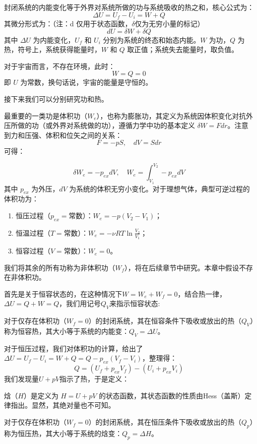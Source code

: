 \begin{proposition}[热力学第一定律]
封闭系统的内能变化等于外界对系统所做的功与系统吸收的热之和，核心公式为：$$\Delta U = U_f - U_i = W + Q$$ 
其微分形式为：（注：d 仅用于状态函数，$\delta$仅为无穷小量的标记）
$$dU = \delta W +\delta Q $$
其中 $\Delta U$ 为内能变化，$U_f$ 和 $U_i$ 分别为系统的终态和始态内能。$W$ 为功，$Q$ 为热，符号上，系统获得能量时，$W$ 和 $Q$ 取正值；系统失去能量时，取负值。
\end{proposition}

对于宇宙而言，不存在环境，此时：
$$W=Q=0$$ 
即 $U$ 为常数，换句话说，宇宙的能量是守恒的。

接下来我们可以分别研究功和热。

最重要的一类功是体积功（$W_e$），也称为膨胀功，其定义为系统因体积变化对抗外压所做的功（或外界对系统做的功），遵循力学中功的基本定义 $\delta W=F dr$。注意到力和压强、体积和位矢之间的关系：
$$F = - p S, \quad dV = S dr$$ 
可得：

\begin{proposition}[体积功]
$$\delta W_e = -p_{ex}dV, \quad W_e = \int_{V_1}^{V_2} -p_{ex}dV$$
其中 $p_{ex}$ 为外压，$dV$ 为系统的体积无穷小变化。对于理想气体，典型可逆过程的体积功为：
\begin{enumerate}
    \item 恒压过程（$p_{ex}=\text{常数}$）：$W_e = -p(V_2 - V_1)$；
    \item 恒温过程（$T=\text{常数}$）：$W_e = - \nu RT\ln\frac{V_2}{V_1}$；
    \item 恒容过程（$V=\text{常数}$）：$W_e = 0$。
\end{enumerate}
\end{proposition}

我们将其余的所有功称为非体积功（$W_f$），将在后续章节中研究。本章中假设不存在非体积功。

首先是关于恒容状态的，在这种情况下$W = W_e + W_f = 0$，结合热一律，$\Delta U = Q + W = Q$，我们用记号$Q_V$来指示恒容状态:

\begin{definition}[恒容（反应）热]
对于仅存在体积功（$W_f=0$）的封闭系统，其在恒容条件下吸收或放出的热（$Q_V$）称为恒容热，其大小等于系统的内能变：$Q_V = \Delta U$。
\end{definition}

对于恒压过程，我们对体积功的计算，给出了$\Delta U = U_f - U_i = W + Q =Q - p_{ex} (V_f - V_i )$，整理得：$$Q =(U_f + p_{ex} V_f ) - (U_i + p_{ex} V_i)$$我们发现量$U + p V$指示了热，于是定义：

\begin{definition}[焓（恒压（反应）热）]
焓（$H$）是定义为 $H = U + pV$ 的状态函数，其状态函数的性质由Hess（盖斯）定律指出。显然，其绝对量也不可知。

对于仅存在体积功（$W_f=0$）的封闭系统，其在恒压条件下吸收或放出的热（$Q_p$）称为恒压热，其大小等于系统的焓变：$Q_p = \Delta H$。
\end{definition}

